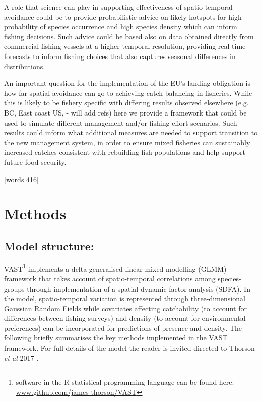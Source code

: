 \documentclass{nature}
\begin{document}
\begin{linenumbers}
A role that science can play in supporting effectiveness of spatio-temporal
avoidance could be to provide probabilistic advice on likely hotspots for high
probability of species occurrence and high species density which can inform
fishing decisions. Such advice could be based also on data obtained directly
from commercial fishing vessels at a higher temporal resolution, providing real
time forecasts to inform fishing choices that also captures seasonal
differences in distributions.

An important question for the implementation of the EU's landing obligation is
how far spatial avoidance can go to achieving catch balancing in fisheries.
While this is likely to be fishery specific with differing results observed
elsewhere (e.g. BC, East coast US, - will add refs) here we provide a framework
that could be used to simulate different management and/or fishing effort
scenarios. Such results could inform what additional measures are needed to
support transition to the new management system, in order to ensure mixed
fisheries can sustainably increased catches consistent with rebuilding fish
populations and help support future food security.

[words 416]

\section*{Methods}

\subsection{Model structure:} 

VAST\footnote{software in the R statistical programming language can be found
	here: \url{www.github.com/james-thorson/VAST}} implements a
delta-generalised linear mixed modelling (GLMM) framework that takes account of
spatio-temporal correlations among species-groups through implementation of a
spatial dynamic factor analysis (SDFA).  In the model, spatio-temporal
variation is represented through three-dimensional Gaussian Random Fields while
covariates affecting catchability (to account for differences between fishing
surveys) and density (to account for environmental preferences) can be
incorporated for predictions of presence and density. The following briefly
summarises the key methods implemented in the VAST framework. For full details
of the model the reader is invited directed to Thorson \textit{et al} 2017
\cite{Thorson2017}.


\end{linenumbers}
\end{document}
